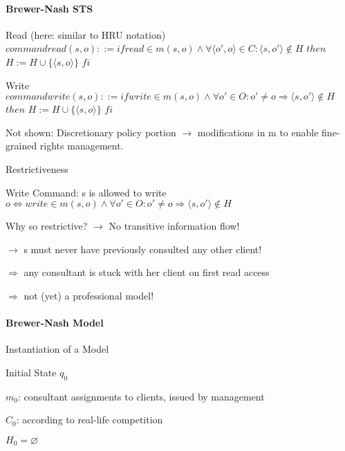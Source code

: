 \documentclass[a4paper]{article}
\begin{document}
\begin{multicols}{3}
    \paragraph{Brewer-Nash STS}
    \begin{itemize*}
        \item Read (here: similar to HRU notation)
              $command read(s,o)::=if read \in m(s,o) \wedge\forall ⟨o',o⟩\in C:⟨s,o'⟩\not\in H$
              $then$
              $H:=H\cup\{⟨s,o⟩\}$
              $fi$
        \item Write
              $command write(s,o)::=if write \in m(s,o) \wedge\forall o'\in O:o'\not=o \Rightarrow ⟨s,o'⟩\not\in H$
              $then$
              $H:=H\cup\{⟨s,o⟩\}$
              $fi$
    \end{itemize*}

    Not shown: Discretionary policy portion $\rightarrow$ modifications in m to enable fine-grained rights management.

    Restrictiveness
    \begin{itemize*}
        \item Write Command: s is allowed to write $o\Leftrightarrow write\in m(s,o)\wedge\forall o'\in O:o'\not=o\Rightarrow⟨s,o'⟩\not\in H$
        \item Why so restrictive? $\rightarrow$ No transitive information flow!
              \begin{itemize*}
                  \item $\rightarrow$ s must never have previously consulted any other client!
                  \item $\Rightarrow$ any consultant is stuck with her client on first read access
                  \item $\Rightarrow$ not (yet) a professional model!
              \end{itemize*}
    \end{itemize*}

    \paragraph{Brewer-Nash Model}
    Instantiation of a Model
    \begin{itemize*}
        \item Initial State $q_0$
              \begin{itemize*}
                  \item $m_0$: consultant assignments to clients, issued by management
                  \item $C_0$: according to real-life competition
                  \item $H_0 =\varnothing$
              \end{itemize*}
    \end{itemize*}


\end{multicols}
\end{document}

